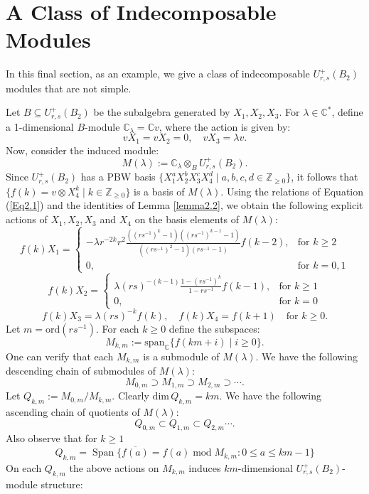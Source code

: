 \documentclass[12 pt,reqno]{amsart}
\numberwithin{equation}{section}
\newcommand{\Z}{\mathbb{Z}}
\theoremstyle{definition}
\theoremstyle{definition}
\theoremstyle{remark}
\theoremstyle{remark}
\begin{document}
\section{A Class of Indecomposable Modules}

In this final section, as an example, we give a class of indecomposable $U_{r,s}^+(B_2)$ modules that are not simple.

Let $ B \subseteq U_{r,s}^+(B_2) $ be the subalgebra generated by $ X_1, X_2, X_3 $. For $ \lambda \in \mathbb{C}^* $, define a 1-dimensional $ B $-module $ \mathbb{C}_\lambda = \mathbb{C}v $, where the action is given by:
    $$vX_1=vX_2=0,\quad vX_3=\lambda v.$$
    Now, consider the induced module:
    $$M(\lambda) := \mathbb{C}_\lambda \otimes_B U_{r,s}^+(B_2).$$
    Since $ U_{r,s}^+(B_2) $ has a PBW basis $ \{ X_1^a X_2^b X_3^c X_4^d\mid a,b,c,d\in \Z_{\geq 0} \} $, it follows that $\{f(k)=v\otimes X_4^k\mid k\in \Z_{\geq 0} \}$ is a basis of $M(\lambda)$. Using the relations of Equation (\ref{Eq2.1}) and the identities of Lemma \ref{lemma2.2}, we obtain the following explicit actions of $X_1,X_2,X_3$ and $X_4$ on the basis  elements of $M(\lambda)$:
    $$f(k)X_1=\begin{cases}
       \displaystyle -\lambda r^{-2k}r^2\frac{\left((rs^{-1})^k-1\right)\left((rs^{-1})^{k-1}-1\right)}{\left((rs^{-1})^2-1\right)\left(rs^{-1}-1\right)}f(k-2), & \text{for } k\geq 2\\
       0, & \text{for } k=0,1
       \end{cases}$$
$$f(k)X_2=\begin{cases}
    \displaystyle\lambda (rs)^{-(k-1)}\frac{1-(rs^{-1})^k}{1-rs^{-1}}f(k-1), &\text{for } k\geq 1\\
    0,& \text{for } k= 0
    \end{cases}$$
    $$ f(k)X_3= \lambda(rs)^{-k}f(k), \quad f(k)X_4=f(k+1) \quad \text{for } k\geq 0.$$
    Let $ {m} = \mathrm{ord}(rs^{-1}) $. For each $k\geq 0$ define the subspaces:
$$
M_{k,m} := \mathrm{span}_\mathbb{C} \{ f(km + i) \mid i \geq 0 \}.
$$
One can verify that each $ M_{k,m} $ is a submodule of $ M(\lambda) $. We have the following descending chain of submodules of $ M(\lambda) $:
$$M_{0,m}\supset M_{1,m}\supset M_{2,m}\supset\cdots.$$
Let $Q_{k,m} := M_{0,m} / M_{k,m}$. Clearly $\mathrm{dim}\,Q_{k,m}=km$. We have the following ascending chain of quotients of $ M(\lambda) $: 
$$Q_{0,m}\subset Q_{1,m}\subset Q_{2,m}\cdots.$$ Also observe that for $k \geq 1$
\[Q_{k,m}= \operatorname{Span}\{\overline{f(a)}=f(a) \operatorname{mod} M_{k,m}: 0 \leq a \leq km-1\}\] On each $Q_{k,m}$ the above actions on $M_{k,m}$ induces $km$-dimensional $U_{r,s}^+(B_2)$-module structure:
\end{document}
